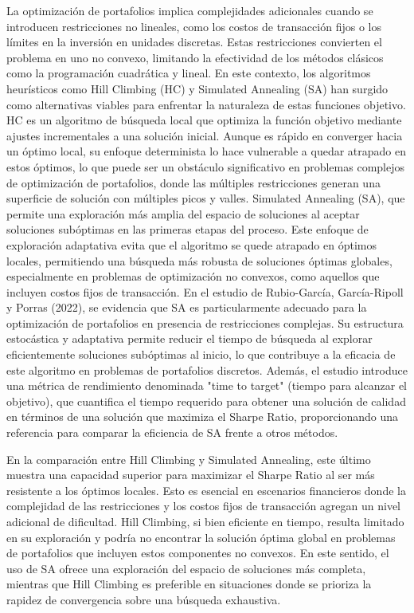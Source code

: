 \documentclass[9pt,a4paper,twoside]{rho-class/rho}
\begin{document}
        La optimización de portafolios implica complejidades adicionales cuando se introducen restricciones no lineales, como los costos de transacción fijos o los límites en la inversión en unidades discretas. Estas restricciones convierten el problema en uno no convexo, limitando la efectividad de los métodos clásicos como la programación cuadrática y lineal. En este contexto, los algoritmos heurísticos como Hill Climbing (HC) y Simulated Annealing (SA) han surgido como alternativas viables para enfrentar la naturaleza de estas funciones objetivo. HC es un algoritmo de búsqueda local que optimiza la función objetivo mediante ajustes incrementales a una solución inicial. Aunque es rápido en converger hacia un óptimo local, su enfoque determinista lo hace vulnerable a quedar atrapado en estos óptimos, lo que puede ser un obstáculo significativo en problemas complejos de optimización de portafolios, donde las múltiples restricciones generan una superficie de solución con múltiples picos y valles. Simulated Annealing (SA), que permite una exploración más amplia del espacio de soluciones al aceptar soluciones subóptimas en las primeras etapas del proceso. Este enfoque de exploración adaptativa evita que el algoritmo se quede atrapado en óptimos locales, permitiendo una búsqueda más robusta de soluciones óptimas globales, especialmente en problemas de optimización no convexos, como aquellos que incluyen costos fijos de transacción. En el estudio de Rubio-García, García-Ripoll y Porras (2022)\cite{Rubio-Garcia2022}, se evidencia que SA es particularmente adecuado para la optimización de portafolios en presencia de restricciones complejas. Su estructura estocástica y adaptativa permite reducir el tiempo de búsqueda al explorar eficientemente soluciones subóptimas al inicio, lo que contribuye a la eficacia de este algoritmo en problemas de portafolios discretos. Además, el estudio introduce una métrica de rendimiento denominada "time to target" (tiempo para alcanzar el objetivo), que cuantifica el tiempo requerido para obtener una solución de calidad en términos de una solución que maximiza el Sharpe Ratio, proporcionando una referencia para comparar la eficiencia de SA frente a otros métodos.
        
        En la comparación entre Hill Climbing y Simulated Annealing, este último muestra una capacidad superior para maximizar el Sharpe Ratio al ser más resistente a los óptimos locales. Esto es esencial en escenarios financieros donde la complejidad de las restricciones y los costos fijos de transacción agregan un nivel adicional de dificultad. Hill Climbing, si bien eficiente en tiempo, resulta limitado en su exploración y podría no encontrar la solución óptima global en problemas de portafolios que incluyen estos componentes no convexos. En este sentido, el uso de SA ofrece una exploración del espacio de soluciones más completa, mientras que Hill Climbing es preferible en situaciones donde se prioriza la rapidez de convergencia sobre una búsqueda exhaustiva.
        
\end{document}
